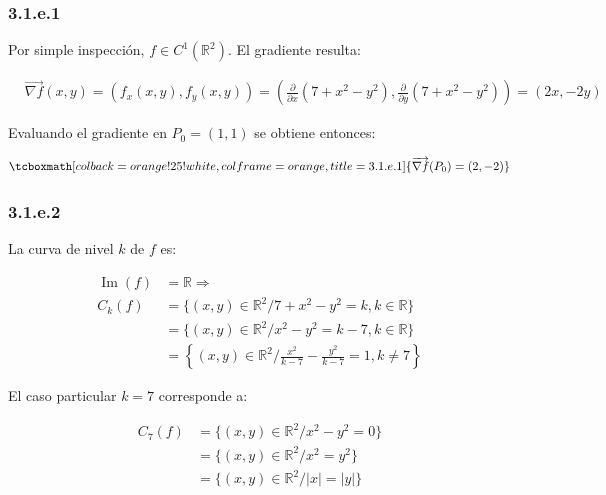 \documentclass{article}
\renewcommand{\Bbb}{\mathbb}
\begin{document}
\subsubsection*{3.1.e.1}
\label{subsubsec:3.1.e.1}

Por simple inspección, $f \in C^1(\Bbb R^2)$. El gradiente resulta:

\begin{align}
& \overrightarrow{ \nabla f }(x,y) = (f_x(x,y), f_y(x,y)) = \left( \frac{\partial}{\partial x}(7 + x^2 - y^2), \frac{\partial}{\partial y}(7 + x^2 - y^2) \right) = (2x, -2y)
\end{align}
 
Evaluando el gradiente en $P_0 = (1,1)$ se obtiene entonces:

\begin{equation}
\tcboxmath[colback=orange!25!white,colframe=orange,title=3.1.e.1]
{
\overrightarrow{ \nabla f }(P_0) = (2, -2)
}
\end{equation}

\subsubsection*{3.1.e.2}
\label{subsubsec:3.1.e.2}

La curva de nivel $k$ de $f$ es:

\begin{subequations}
\begin{align}
\mathop{Im}(f) &= \Bbb R \Rightarrow \\
C_k(f) &= \{ (x,y) \in \Bbb R^2 / 7 +x^2 -y^2 = k, k \in \Bbb R \} \\
       &= \{ (x,y) \in \Bbb R^2 / x^2 -y^2 = k-7, k \in \Bbb R \} \\
       &= \left\{ (x,y) \in \Bbb R^2 / \frac{x^2}{k-7} -\frac{y^2}{k-7} = 1, k \neq 7 \right\}
\end{align}
\end{subequations}

El caso particular $k=7$ corresponde a:

\begin{subequations}
\begin{align}
C_7(f) &= \{ (x,y) \in \Bbb R^2 / x^2 -y^2 = 0 \} \\
       &= \{ (x,y) \in \Bbb R^2 / x^2 = y^2 \} \\
       &= \{ (x,y) \in \Bbb R^2 / |x| = |y| \}
\end{align}
\end{subequations}
\end{document}

